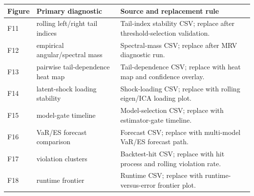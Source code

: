 \begingroup
\footnotesize
\setlength{\tabcolsep}{4pt}
\renewcommand{\arraystretch}{1.12}
\begin{tabularx}{\linewidth}{@{}p{1.0cm}p{3.8cm}X@{}}
\toprule
\textbf{Figure} & \textbf{Primary diagnostic} & \textbf{Source and replacement rule} \\
\midrule
F11 & rolling left/right tail indices & Tail-index stability CSV; replace after threshold-selection validation. \\
F12 & empirical angular/spectral mass & Spectral-mass CSV; replace after MRV diagnostic run. \\
F13 & pairwise tail-dependence heat map & Tail-dependence CSV; replace with heat map and confidence overlay. \\
F14 & latent-shock loading stability & Shock-loading CSV; replace with rolling eigen/ICA loading plot. \\
F15 & model-gate timeline & Model-selection CSV; replace with estimator-gate timeline. \\
F16 & VaR/ES forecast comparison & Forecast CSV; replace with multi-model VaR/ES forecast path. \\
F17 & violation clusters & Backtest-hit CSV; replace with hit process and rolling violation rate. \\
F18 & runtime frontier & Runtime CSV; replace with runtime-versus-error frontier plot. \\
\bottomrule
\end{tabularx}
\endgroup
